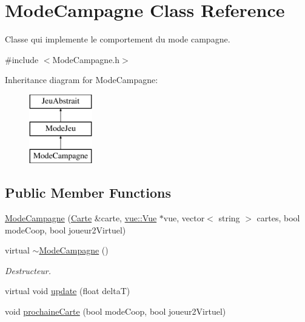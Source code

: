 \hypertarget{class_mode_campagne}{\section{Mode\-Campagne Class Reference}
\label{class_mode_campagne}
}


Classe qui implemente le comportement du mode campagne.  




{\ttfamily \#include $<$Mode\-Campagne.\-h$>$}

Inheritance diagram for Mode\-Campagne\-:\begin{figure}[H]
\begin{center}
\leavevmode
\includegraphics[height=3.000000cm]{class_mode_campagne}
\end{center}
\end{figure}
\subsection*{Public Member Functions}
\begin{DoxyCompactItemize}
\item 
\hyperlink{group__inf2990_gab31521e8515297d0115db8e43d862fbb}{Mode\-Campagne} (\hyperlink{class_carte}{Carte} \&carte, \hyperlink{classvue_1_1_vue}{vue\-::\-Vue} $\ast$vue, vector$<$ string $>$ cartes, bool mode\-Coop, bool joueur2\-Virtuel)
\item 
\hypertarget{group__inf2990_gad5c62416d036e67d8ce06fe9753e37fc}{virtual \hyperlink{group__inf2990_gad5c62416d036e67d8ce06fe9753e37fc}{$\sim$\-Mode\-Campagne} ()}\label{group__inf2990_gad5c62416d036e67d8ce06fe9753e37fc}

\begin{DoxyCompactList}\small\item\em Destructeur. \end{DoxyCompactList}\item 
virtual void \hyperlink{group__inf2990_ga5d794c1c233a859a92de85a2b60ba4fd}{update} (float delta\-T)
\item 
void \hyperlink{group__inf2990_ga0b02f51f6938b11d49af9a678e939174}{prochaine\-Carte} (bool mode\-Coop, bool joueur2\-Virtuel)
\end{DoxyCompactItemize}
